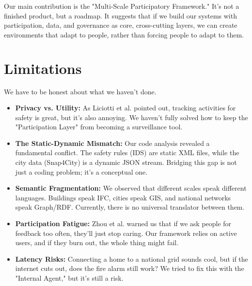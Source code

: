 \documentclass[a4paper,oneside,12pt]{report}
\begin{document}
Our main contribution is the "Multi-Scale Participatory Framework." It's not a finished product, but a roadmap. It suggests that if we build our systems with participation, data, and governance as core, cross-cutting layers, we can create environments that adapt to people, rather than forcing people to adapt to them.

\section{Limitations}
We have to be honest about what we haven't done.
\begin{itemize}
    \item \textbf{Privacy vs. Utility:} As Liciotti et al.\cite{Liciotti2020} pointed out, tracking activities for safety is great, but it's also annoying. We haven't fully solved how to keep the "Participation Layer" from becoming a surveillance tool.
    \item \textbf{The Static-Dynamic Mismatch:} Our code analysis revealed a fundamental conflict. The safety rules (IDS) are static XML files, while the city data (Snap4City) is a dynamic JSON stream. Bridging this gap is not just a coding problem; it's a conceptual one.
    \item \textbf{Semantic Fragmentation:} We observed that different scales speak different languages. Buildings speak IFC, cities speak GIS, and national networks speak Graph/RDF. Currently, there is no universal translator between them.
    \item \textbf{Participation Fatigue:} Zhou et al.\cite{Zhou2024} warned us that if we ask people for feedback too often, they'll just stop caring. Our framework relies on active users, and if they burn out, the whole thing might fail.
    \item \textbf{Latency Risks:} Connecting a home to a national grid sounds cool, but if the internet cuts out, does the fire alarm still work? We tried to fix this with the "Internal Agent," but it's still a risk.
\end{itemize}
\end{document}

